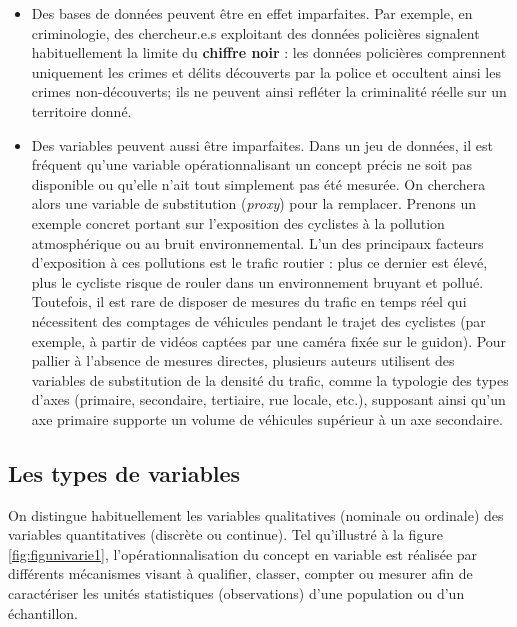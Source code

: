 \documentclass[
  11pt,
  french,
]{book}
\makeatletter
\newenvironment{kframev}{%
\medskip{}
\setlength{\fboxsep}{.8em}
 \def\at@end@of@kframev{}%
 \ifinner\ifhmode%
  \def\at@end@of@kframev{\end{minipage}}%
  \begin{minipage}{\columnwidth}%
 \fi\fi%
 \def\FrameCommand##1{\hskip\@totalleftmargin \hskip-\fboxsep
 \colorbox{shadebluecolor}{##1}\hskip-\fboxsep
     \hskip-\linewidth \hskip-\@totalleftmargin \hskip\columnwidth}%
 \MakeFramed {\advance\hsize-\width
   \@totalleftmargin\z@ \linewidth\hsize
   \@setminipage}}%
 {\par\unskip\endMakeFramed%
 \at@end@of@kframev}
\newenvironment{rmdblock}[1]
  {
  \begin{itemize}
  \renewcommand{\labelitemi}{
    \raisebox{-.7\height}[0pt][0pt]{
      {\setkeys{Gin}{width=3em,keepaspectratio}\texttt{[image: images/\#1]}}
    }
  }
  \setlength{\fboxsep}{1em}
  \begin{kframev}
  \small
  \item
  }
  {
  \end{kframev}
  \end{itemize}
  }
\newenvironment{bloc_attention}
  {\begin{rmdblock}{attention}}
  {\end{rmdblock}}
\makeatother
\begin{document}
\begin{bloc_attention}
\begin{itemize}
\item
  Des bases de données peuvent être en effet imparfaites. Par exemple, en criminologie, des chercheur.e.s exploitant des données policières signalent habituellement la limite du \textbf{chiffre noir} : les données policières comprennent uniquement les crimes et délits découverts par la police et occultent ainsi les crimes non-découverts; ils ne peuvent ainsi refléter la criminalité réelle sur un territoire donné.
\item
  Des variables peuvent aussi être imparfaites. Dans un jeu de données, il est fréquent qu'une variable opérationnalisant un concept précis ne soit pas disponible ou qu'elle n'ait tout simplement pas été mesurée. On cherchera alors une variable de substitution (\emph{proxy}) pour la remplacer. Prenons un exemple concret portant sur l'exposition des cyclistes à la pollution atmosphérique ou au bruit environnemental. L'un des principaux facteurs d'exposition à ces pollutions est le trafic routier : plus ce dernier est élevé, plus le cycliste risque de rouler dans un environnement bruyant et pollué. Toutefois, il est rare de disposer de mesures du trafic en temps réel qui nécessitent des comptages de véhicules pendant le trajet des cyclistes (par exemple, à partir de vidéos captées par une caméra fixée sur le guidon). Pour pallier à l'absence de mesures directes, plusieurs auteurs utilisent des variables de substitution de la densité du trafic, comme la typologie des types d'axes (primaire, secondaire, tertiaire, rue locale, etc.), supposant ainsi qu'un axe primaire supporte un volume de véhicules supérieur à un axe secondaire.
\end{itemize}

\end{bloc_attention}

\hypertarget{sect0212}{%
\subsection{Les types de variables}\label{sect0212}}

On distingue habituellement les variables qualitatives (nominale ou ordinale) des variables quantitatives (discrète ou continue). Tel qu'illustré à la figure \ref{fig:figunivarie1}, l'opérationnalisation du concept en variable est réalisée par différents mécanismes visant à qualifier, classer, compter ou mesurer afin de caractériser les unités statistiques (observations) d'une population ou d'un échantillon.
\end{document}
